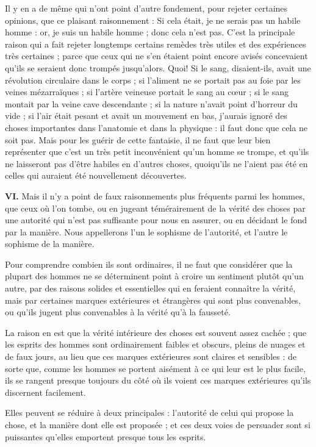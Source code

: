 Il y en a de même qui n'ont point d'autre fondement, pour rejeter certaines opinions, que ce plaisant raisonnement : Si cela était, je ne serais pas un habile homme : or, je suis un habile homme ; donc cela n'est pas. C'est la principale raison qui a fait rejeter longtemps certains remèdes très utiles et des expériences très certaines ; parce que ceux qui ne s'en étaient point encore avisés concevaient qu'ils se seraient donc trompés jusqu'alors. Quoi! Si le sang, disaient-ils, avait une révolution circulaire dans le corps ; si l'aliment ne se portait pas au foie par les veines mézarraïques ; si l'artère veineuse portait le sang au cœur ; si le sang montait par la veine cave descendante ; si la nature n'avait point d'horreur du vide ; si l'air était pesant et avait un mouvement en bas, j'aurais ignoré des choses importantes dans l'anatomie et dans la physique : il faut donc que cela ne soit pas. Mais pour les guérir de cette fantaisie, il ne faut que leur bien représenter que c'est un très petit inconvénient qu'un homme se trompe, et qu'ils ne laisseront pas d'être habiles en d'autres choses, quoiqu'ils ne l'aient pas été en celles qui auraient été nouvellement découvertes.

\bigbreak
{\bfseries\scshape VI.} Mais il n'y a point de faux raisonnements plus fréquents parmi les hommes, que ceux où l'on tombe, ou en jugeant témérairement de la vérité des choses par une autorité qui n'est pas suffisante pour nous en assurer, ou en décidant le fond par la manière. Nous appellerons l'un le sophisme de l'autorité, et l'autre le sophisme de la manière.

Pour comprendre combien ils sont ordinaires, il ne faut que considérer que la plupart des hommes ne se déterminent point à croire un sentiment plutôt qu'un autre, par des raisons solides et essentielles qui en feraient connaître la vérité, mais par certaines marques extérieures et étrangères qui sont plus convenables, ou qu'ils jugent plus convenables à la vérité qu'à la fausseté.

La raison en est que la vérité intérieure des choses est souvent assez cachée ; que les esprits des hommes sont ordinairement faibles et obscurs, pleins de nuages et de faux jours, au lieu que ces marques extérieures sont claires et sensibles : de sorte que, comme les hommes se portent aisément à ce qui leur est le plus facile, ils se rangent presque toujours du côté où ils voient ces marques extérieures qu'ils discernent facilement.

Elles peuvent se réduire à deux principales : l'autorité de celui qui propose la chose, et la manière dont elle est proposée ; et ces deux voies de persuader sont si puissantes qu'elles emportent presque tous les esprits.

